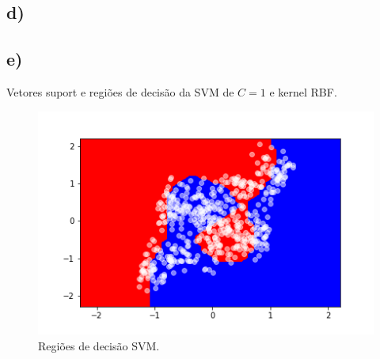 \documentclass{article}
\begin{document}
    \subsection*{d)}

    \subsection*{e)}
    Vetores suport e regiões de decisão da SVM de $C=1$ e kernel RBF. 
    \begin{figure}[H]
        \centering
        \includegraphics[width=\linewidth]{svm_decision.png}   
        \caption{Regiões de decisão SVM.}
        \label{fig:svm_decision}
    \end{figure}
\end{document}
